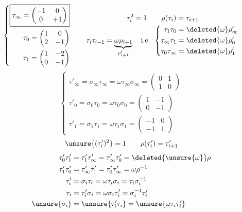 \[
\left\{\begin{aligned}
\boxed{\tau_\infty=\begin{pmatrix}-1&0\\0&+1\end{pmatrix}}\\
\tau_0=\begin{pmatrix}1&0\\2&-1\end{pmatrix}\\
\tau_1=\begin{pmatrix}1&-2\\0&-1\end{pmatrix}
\end{aligned}\right.
\qquad
\begin{gathered}
\tau_i^2=1\qquad\rho(\tau_i)=\tau_{i+1}\\
\tau_i\tau_{i-1}=\underbrace{\omega\rho_{i+1}}_{\rho'_{i+1}}\quad\text{i.e. }
\left\{\begin{aligned}
\tau_1\tau_0&=\deleted{\omega}\rho'_\infty\\
\tau_\infty\tau_1&=\deleted{\omega}\rho'_0\\
\tau_0\tau_\infty&=\deleted{\omega}\rho'_1
\end{aligned}\right.
\end{gathered}
\]
\[
\left\{\begin{aligned}
\boxed{\tau'_\infty=\sigma_\infty\tau_\infty=\omega\tau_\infty\sigma_\infty=\begin{pmatrix}0&1\\1&0\end{pmatrix}}\\
\tau'_0=\sigma_0\tau_0=\omega\tau_0\sigma_0=\begin{pmatrix}1&-1\\0&-1\end{pmatrix}\\
\tau'_1=\sigma_1\tau_1=\omega\tau_1\sigma_1=\begin{pmatrix}-1&0\\-1&1\end{pmatrix}
\end{aligned}\right.
\]
\[
\unsure{(\tau'_i)^2}=1\qquad\rho(\tau'_i)=\tau'_{i+1}
\]
\[
\begin{aligned}
\tau'_0\tau'_1&=\tau'_1\tau'_\infty=\tau'_\infty\tau'_0=\deleted{\unsure{\omega}}\rho\\
\tau'_1\tau'_0&=\tau'_\infty\tau'_1=\tau'_0\tau'_\infty=\omega\rho^{-1}\\
\tau'_i&=\sigma_i\tau_i=\omega\tau_i\sigma_i=\tau_i\sigma_i^{-1}\\
\tau_i&=\tau'_i\sigma_i=\omega\sigma_i\tau'_i=\sigma_i^{-1}\tau'_i\\
\unsure{\sigma_i}&=\unsure{\tau'_i\tau_i}=\unsure{\omega\tau_i\tau'_i}
\end{aligned}
\]

